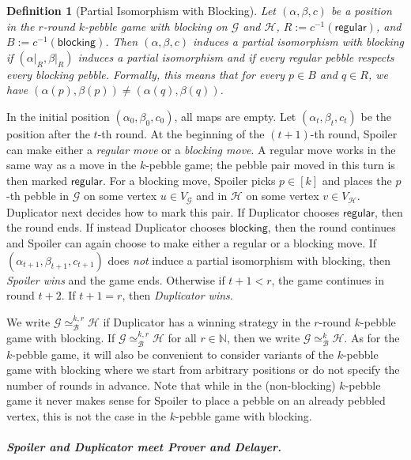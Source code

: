\documentclass[10pt,a4paper]{article}
\newcommand{\defining}[1]{\emph{#1}}
\newcommand{\regular}{\mathsf{regular}}
\newcommand{\blocking}{\mathsf{blocking}}
\newcommand{\graphG}{\mathcal{G}}
\newcommand{\graphH}{\mathcal{H}}
\newcommand{\vertexG}{V_{\graphG}}
\newcommand{\vertexH}{V_{\graphH}}
\newcommand{\kbequivr}[2]{\simeq_{\mathcal{B}}^{#1,#2}}
\newcommand{\kbequiv}[1]{\simeq_{\mathcal{B}}^{#1}}
\newtheorem{definition}[theorem]{Definition}
\begin{document}
\begin{definition}[Partial Isomorphism with Blocking] \label{def: pi_block}
        Let $(\alpha, \beta, c)$ be a position in the $r$\nobreakdash-round $k$\nobreakdash-pebble game with blocking on $\graphG$ and  $\graphH$, $R := c^{-1}(\regular)$, and $B := c^{-1}(\blocking)$. Then $(\alpha, \beta, c)$ 
        \defining{induces a  partial isomorphism with blocking} if $(\left.\alpha\right|_R, \left.\beta\right|_R)$ induces a partial isomorphism and
        if every regular pebble respects every blocking pebble. Formally, this means that for every $p\in B$ and $q\in R$, 
        we have $(\alpha(p), \beta(p) ) \neq (\alpha(q), \beta(q))$.
\end{definition}
In the initial position $(\alpha_0, \beta_0, c_0)$,
all maps are empty.
Let $(\alpha_t, \beta_t, c_t)$ be the position after the $t$-th round.
At the beginning of the $(t+1)$-th round,
Spoiler can make either a \defining{regular move} or a \defining{blocking move}.
A regular move works in the same way as a move in the $k$-pebble game; the pebble pair moved in this turn is then marked $\mathsf{\regular}$.
For a blocking move, Spoiler picks $p\in [k]$ and places the $p$\nobreakdash-th pebble in $\graphG$ on some vertex $u\in \vertexG$ and in $\graphH$ on some vertex $v\in \vertexH$.
Duplicator next decides how to mark this pair.
If Duplicator chooses $\mathsf{\regular}$, then the round ends.
If instead Duplicator chooses $\blocking$, then the round continues and Spoiler can again choose to make either a regular or a blocking move. If $(\alpha_{t+1}, \beta_{t+1}, c_{t+1})$ does \emph{not} induce a partial isomorphism with blocking, then \defining{Spoiler wins} and the game ends. Otherwise if $t+1 < r$, the game continues in round $t+2$.
If $t+1 = r$, then \defining{Duplicator wins}.

We write $\graphG \kbequivr{k}{r} \graphH$ if Duplicator has a winning strategy in the $r$-round $k$-pebble game with blocking. If $\graphG \kbequivr{k}{r} \graphH$ for all $r \in \mathbb{N}$, then we write $\graphG \kbequiv{k} \graphH$. As for the $k$-pebble game, it will also be convenient to consider variants of the $k$-pebble game with blocking where we start from arbitrary positions or do not specify the number of rounds in advance. Note that while in the (non-blocking) $k$-pebble game it never makes sense for Spoiler to place a pebble on an already pebbled vertex, this is not the case in the $k$-pebble game with blocking.

\subparagraph*{Spoiler and Duplicator meet Prover and Delayer.}
\end{document}

